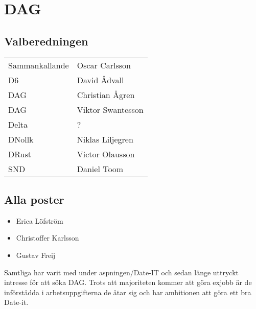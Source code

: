 \section{DAG}


\subsection{Valberedningen}
\begin{autoframe}

\begin{tabular}{ll}
Sammankallande & Oscar Carlsson \\
D6 & David Ådvall \\
DAG  & Christian Ågren \\
DAG  & Viktor Swantesson \\
Delta  & ? \\
DNollk & Niklas Liljegren \\
DRust & Victor Olausson \\
SND  & Daniel Toom
\end{tabular}
\end{autoframe}

\subsection{Alla poster}

\begin{autoframe}
\begin{itemize}
\item Erica Löfström
\item Christoffer Karlsson
\item Gustav Freij
\end{itemize}


\bigskip
Samtliga har varit med under aspningen/Date-IT och sedan länge uttryckt intresse för att söka DAG. Trots att majoriteten kommer att göra exjobb är de införstådda i arbetsuppgifterna de åtar sig och har ambitionen att göra ett bra Date-it.
\end{autoframe}
